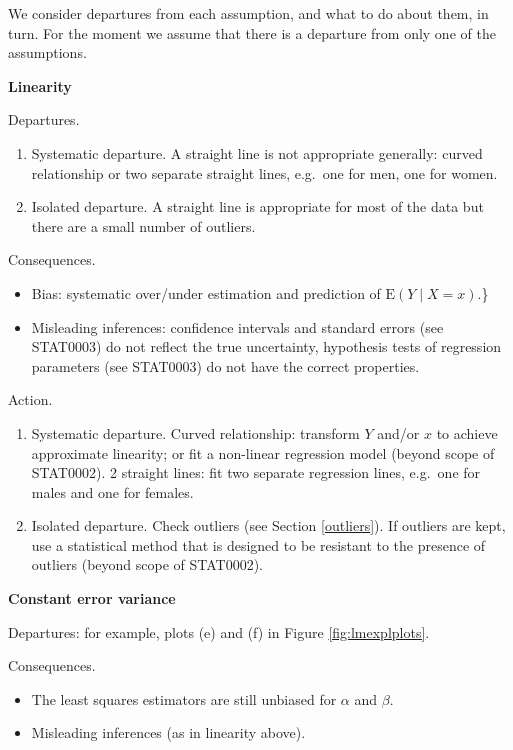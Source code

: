 \documentclass[
  british,
  11pt,
  openany, a4paper]{book}
\providecommand{\tightlist}{%
  \setlength{\itemsep}{0pt}\setlength{\parskip}{0pt}}
\begin{document}
We consider departures from each assumption, and what to do about them, in turn.
For the moment we assume that there is a departure from only one of the assumptions.

\textbf{Linearity}

Departures.

\begin{enumerate}
\def\labelenumi{\alph{enumi}.}
\tightlist
\item
  Systematic departure. A straight line is not appropriate generally: curved relationship or two separate straight lines, e.g.~one for men, one for women.
\item
  Isolated departure. A straight line is appropriate for most of the data but there are a small number of outliers.
\end{enumerate}

Consequences.

\begin{itemize}
\tightlist
\item
  Bias: systematic over/under estimation and prediction of \(\text{E}(Y \mid X=x)\).\}
\item
  Misleading inferences: confidence intervals and standard errors (see STAT0003)
  do not reflect the true uncertainty, hypothesis tests of regression parameters
  (see STAT0003) do not have the correct properties.
\end{itemize}

Action.

\begin{enumerate}
\def\labelenumi{\alph{enumi}.}
\tightlist
\item
  Systematic departure. Curved relationship: transform \(Y\) and/or \(x\) to achieve approximate linearity; or fit a non-linear regression model (beyond scope of STAT0002). 2 straight lines: fit two separate regression lines, e.g.~one for males and one for females.
\item
  Isolated departure. Check outliers (see Section \ref{outliers}). If outliers are kept, use a statistical method that is designed to be resistant to the presence of outliers (beyond scope of STAT0002).
\end{enumerate}

\textbf{Constant error variance}

Departures: for example, plots (e) and (f) in Figure \ref{fig:lmexplplots}.

Consequences.

\begin{itemize}
\tightlist
\item
  The least squares estimators are still unbiased for \(\alpha\) and \(\beta\).
\item
  Misleading inferences (as in linearity above).
\end{itemize}
\end{document}
